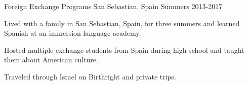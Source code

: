 \begin{cventries}
{Foreign Exchange Programs} %
{San Sebastian, Spain} %
{Summers 2013-2017} %
{
	\begin{cvitems} %
		\item {Lived with a family in San Sebastian, Spain, for three summers and learned Spanish at an immersion language academy.}
		\item {Hosted multiple exchange students from Spain during high school and taught them about American culture.}
		\item {Traveled through Israel on Birthright and private trips.}
	\end{cvitems}
}
\end{cventries}
